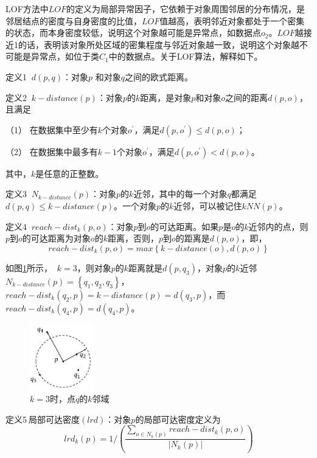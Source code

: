 LOF方法中$LOF$的定义为局部异常因子，它依赖于对象周围邻居的分布情况，是邻居结点的密度与自身密度的比值，$LOF$值越高，表明邻近对象都处于一个密集的状态，而本身密度较低，说明这个对象越可能是异常点，如数据点$o_2$。$LOF$越接近1的话，表明该对象所处区域的密集程度与邻近对象越一致，说明这个对象越不可能是异常点，如位于类$C_1$中的数据点。关于LOF算法，解释如下。

定义1 $\ d(p, q)$：对象$p$ 和对象$q$之间的欧式距离。

定义2 $\ k-distance(p)$：对象$p$的$k$距离，是对象$p$和对象$o$之间的距离$d(p, o)$，且满足

（1） 在数据集中至少有$k$个对象$o^{'}$，满足$d(p,o^{'})\leq d(p,o)$；

（2） 在数据集中最多有$k-1$个对象$o^{'}$，满足$d(p,o^{'}) < d(p,o)$。

其中，$k$是任意的正整数。

定义3 $\ N_{k-distance}(p)$：对象$p$的$k$近邻，其中的每一个对象$q$都满足$d(p,q)\leq k-distance(p)$。一个对象$p$的$k$近邻，可以被记住$kNN(p)$。

定义4 $\ reach-dist_k(p,o)$：对象$p$到$o$的可达距离。如果$p$是$o$的$k$近邻内的点，则$p$到$o$的可达距离为对象$o$的$k$距离，否则，$p$到$o$的距离是$d(p, o)$，即，
 \begin{equation}reach-dist_k(p, o) = max\left \{ k-distance(o), d(p, o) \right \}\end{equation}

如图\ref{fig:fig31}所示， $\ k=3$，则对象$p$的$k$距离就是$d(p, q_3)$，对象$p$的$k$近邻$N_{k-distance}(p) = \left \{ q_{1}, q_{2}, q_{3} \right \}$，
$reach-dist_k(q_2, p) = k-distance(p) = d(q_3, p)$，而$reach-dist_k(q_4, p) = d(q_4, p)$。
\begin{figure}
	\centering
	\includegraphics[width=0.25\textwidth]{figures/figure3x1}
	\caption{$k=3$时，点$q$的$k$邻域}\label{fig:fig31}
\end{figure}

定义5$\ $局部可达密度$(lrd)$：对象$p$的局部可达密度定义为
\begin{equation}
lrd_{k}\left ( p \right ) = 1 / \left ( \frac{\sum_{o\in N_{k}\left ( p \right )}reach-dist_{k}\left ( p,o \right )}{\left | N_{k}\left ( p \right ) \right |} \right )
\end{equation}

